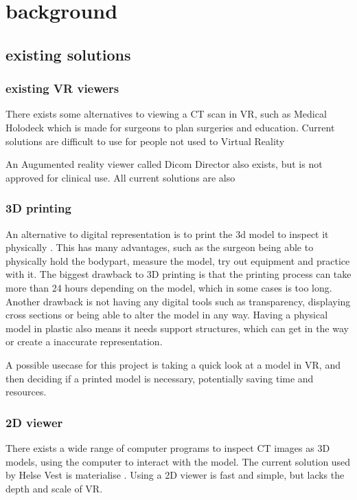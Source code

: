 \documentclass[11pt]{scrartcl}
\begin{document}
\section{ background } 

\subsection{ existing solutions}

\subsubsection{existing VR viewers}

There exists some alternatives to viewing a CT scan in VR, such as Medical Holodeck \cite{holodeck} which is made for surgeons to plan surgeries and education. Current solutions are difficult to use for people not used to Virtual Reality

An Augumented reality viewer called Dicom Director also exists, but is not approved for clinical use. \cite{dicomdirector} All current solutions are also 


\subsubsection { 3D printing }

An alternative to digital representation is to print the 3d model to inspect it physically \cite{virtualplanningand3dprinting}. This has many advantages, such as the surgeon being able to physically hold the bodypart, measure the model, try out equipment and practice with it.
The biggest drawback to 3D printing is that the printing process can take more than 24 hours depending on the model, which in some cases is too long. Another drawback is not having any digital tools such as transparency, displaying cross sections or being able to alter the model in any way. Having a physical model in plastic also means it needs support structures, which can get in the way or create a inaccurate representation.

A possible usecase for this project is taking a quick look at a model in VR, and then deciding if a printed model is necessary, potentially saving time and resources.

\subsubsection {2D viewer}

There exists a wide range of computer programs to inspect CT images as 3D models, using the computer to interact with the model.
The current solution used by Helse Vest is materialise \cite{materialise}. Using a 2D viewer is fast and simple, but lacks the depth and scale of VR.
\end{document}
